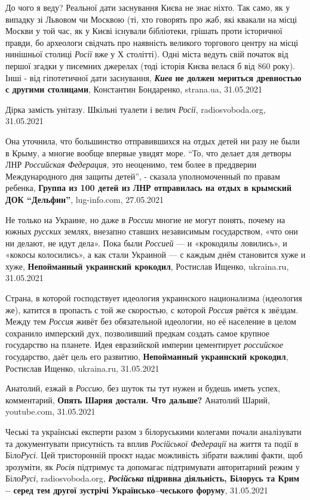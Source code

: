 До чого я веду? Реальної дати заснування Києва не знає ніхто. Так само, як у
випадку зі Львовом чи Москвою (ті, хто говорять про жаб, які квакали на місці
Москви у той час, як у Києві існували бібліотеки, грішать проти історичної
правди, бо археологи свідчать про наявність великого торгового центру на місці
нинішньої столиці \emph{Росії} вже у Х столітті). Одні міста ведуть свій
початок від першої згадки у писемних джерелах (тоді історія Києва велася б від
860 року).  Інші - від гіпотетичної дати заснування, \textbf{\emph{Киев} не
должен мериться древностью с другими столицами}, Константин Бондаренко,
strana.ua, 31.05.2021

Дірка замість унітазу. Шкільні туалети і велич \emph{Росії}, radiosvoboda.org,
31.05.2021

Она уточнила, что большинство отправившихся на отдых детей ни разу не были в
Крыму, а многие вообще впервые увидят море.  \enquote{То, что делает для
детворы ЛНР \emph{Российская Федерация}, это неоценимо, тем более в преддверии
Международного дня защиты детей}, - сказала уполномоченный по правам ребенка,
\textbf{Группа из 100 детей из ЛНР отправилась на отдых в крымский ДОК
\enquote{Дельфин}}, lug-info.com, 27.05.2021

Не только на Украине, но даже в \emph{России} многие не могут понять, почему на южных
\emph{русских} землях, внезапно ставших независимым государством, «что они ни делают,
не идут дела». Пока были \emph{Россией} — и «крокодилы ловились», и «кокосы
колосились», а как стали Украиной — с каждым днём становится хуже и хуже,
\textbf{Непойманный украинский крокодил}, Ростислав Ищенко, ukraina.ru, 31.05.2021

Страна, в которой господствует идеология украинского национализма (идеология
же), катится в пропасть с той же скоростью, с которой \emph{Россия} рвётся к
звёздам.  Между тем \emph{Россия} живёт без обязательной идеологии, но её
население в целом сохранило имперский дух, позволивший предкам создать самое
крупное государство на планете. Идея евразийской империи цементирует
\emph{российское} государство, даёт цель его развитию, 
\textbf{Непойманный украинский крокодил}, Ростислав Ищенко, ukraina.ru, 31.05.2021

Анатолий, езжай в \emph{Россию}, без шуток ты тут нужен и будешь иметь успех,
комментарий, \textbf{Опять Шария достали. Что дальше?} Анатолий Шарий, youtube.com, 31.05.2021

Чеські та українські експерти разом з білоруськими колегами почали аналізувати
та документувати присутність та вплив \emph{Російської Федерації} на життя та події в
Біло\emph{Русі}. Цей тристоронній проєкт надає можливість зібрати важливі факти, щоб
зрозуміти, як \emph{Росія} підтримує та допомагає підтримувати авторитарний режим у
Біло\emph{Русі},
radiosvoboda.org, \textbf{\emph{Російська} підривна діяльність, Білорусь та Крим –
серед тем другої зустрічі Українсько–чеського форуму}, 31.05.2021

